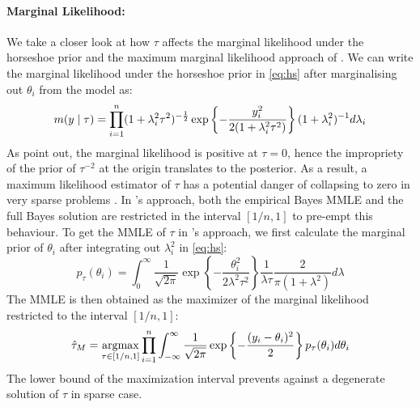 \documentclass[11pt]{article}
\begin{document}

\paragraph{Marginal Likelihood: } We take a closer look at how $\tau$ affects the marginal likelihood under the horseshoe prior and the maximum marginal likelihood approach of \cite{van2017adaptive}. 
We can write the marginal likelihood under the horseshoe prior in \eqref{eq:hs} after marginalising out $\theta_i$ from the model as:
\begin{equation}
m(y \mid \tau) = \prod_{i=1}^{n} (1+\lambda_i^2 \tau^2)^{-\frac{1}{2}} \exp \left \{ - \frac{y_i^2}{2(1+\lambda_i^2 \tau^2)} \right \}  (1+\lambda_i^2)^{-1} d \lambda_i 
\end{equation}
As \citet{tiao1965bayesian} point out, the marginal likelihood is positive at 
$\tau = 0$, hence the impropriety of the prior of $\tau^{-2}$ at the origin
translates to the posterior. As a result, a maximum likelihood estimator of
$\tau$ has a potential danger of collapsing to zero in very sparse problems
\citep{polson2010shrink, datta2013asymptotic}. In \cite{van2017adaptive}'s
approach, both the empirical Bayes MMLE and the full Bayes solution are
restricted in the interval $[1/n,1]$ to pre-empt this behaviour. To get the
MMLE of $\tau$ in \cite{van2017adaptive}'s approach,  we first calculate the
marginal prior of $\theta_i$ after integrating out $\lambda_i^2$ in
\eqref{eq:hs}:
\begin{equation}
p_{\tau}(\theta_i) = \int_{0}^{\infty} \frac{1}{\sqrt{2 \pi}} \exp \left\{ - \frac{\theta_i^2}{2\lambda^2 \tau^2} \right\} \frac{1}{\lambda \tau} \frac{2}{\pi(1+\lambda^2)} d\lambda
\end{equation}
The MMLE is then obtained as the maximizer of the marginal likelihood restricted to the interval $[1/n,1]$: 
\begin{equation}
\hat{\tau}_M = \argmax_{\tau \in [1/n,1]} \prod_{i=1}^{n} \int_{-\infty}^{\infty} \frac{1}{\sqrt{2 \pi}} \exp \left\{ - \frac{(y_i -\theta_i)^2}{2} \right\} p_{\tau}(\theta_i) d\theta_i
\end{equation}
The lower bound of the maximization interval prevents against a degenerate solution of $\tau$ in sparse case. 

%
\end{document}
